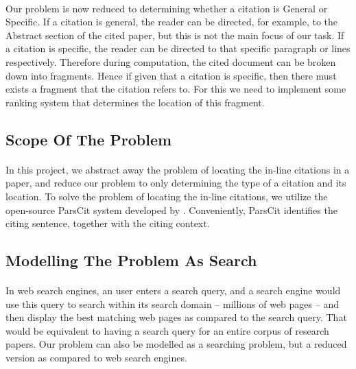 \paragraph{}
Our problem is now reduced to determining whether a citation is General or Specific. If a citation is general, the reader can be directed, for example, to the Abstract section of the cited paper, but this is not the main focus of our task. If a citation is specific, the reader can be directed to that specific paragraph or lines respectively. Therefore during computation, the cited document can be broken down into fragments. Hence if given that a citation is specific, then there must exists a fragment that the citation refers to. For this we need to implement some ranking system that determines the location of this fragment.

\subsection{Scope Of The Problem}
\paragraph{}
In this project, we abstract away the problem of locating the in-line citations in a paper, and reduce our problem to only determining the type of a citation and its location. To solve the problem of locating the in-line citations, we utilize the open-source ParsCit system developed by \cite{parscit}. Conveniently, ParsCit identifies the citing sentence, together with the citing context.

\subsection{Modelling The Problem As Search}
\paragraph{}
In web search engines, an user enters a search query, and a search engine would use this query to search within its search domain -- millions of web pages -- and then display the best matching web pages as compared to the search query. That would be equivalent to having a search query for an entire corpus of research papers. Our problem can also be modelled as a searching problem, but a reduced version as compared to web search engines.

